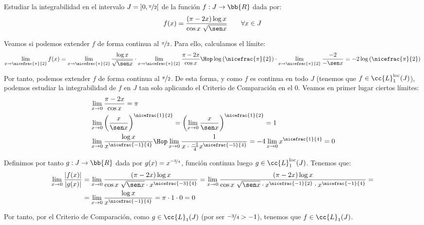 \begin{ejercicio}
    Estudiar la integrabilidad en el intervalo $J=\left]0,\nicefrac{\pi}{2}\right[$ de la función $f:J\to \bb{R}$ dada por:
    \begin{equation*}
        f(x) = \dfrac{(\pi-2x)\log x}{\cos x~\sqrt{\sen x}}
        \qquad \forall x\in J
    \end{equation*}

    Veamos si podemos extender $f$ de forma continua al $\nicefrac{\pi}{2}$. Para ello, calculamos el límite:
    \begin{equation*}
        \lim_{x\to \nicefrac{\pi}{2}} f(x)
        = \lim_{x\to \nicefrac{\pi}{2}} \dfrac{\log x}{\sqrt{\sen x}}\cdot \lim_{x\to \nicefrac{\pi}{2}} \dfrac{\pi-2x}{\cos x}
        \Hop \log\left(\nicefrac{\pi}{2}\right)\cdot \lim_{x\to \nicefrac{\pi}{2}} \dfrac{-2}{-\sen x}
        = -2\log\left(\nicefrac{\pi}{2}\right)
    \end{equation*}

    Por tanto, podemos extender $f$ de forma continua al $\nicefrac{\pi}{2}$. De esta forma, y como $f$ es continua en todo $J$ (tenemos que $f\in \cc{L}_1^{\text{loc}}(J)$), podemos estudiar la integrabilidad de $f$ en $J$ tan solo aplicando el Criterio de Comparación en el $0$.
    Veamos en primer lugar ciertos límites:
    \begin{align*}
        &\lim_{x\to 0} \dfrac{\pi-2x}{\cos x}=\pi\\
        &\lim_{x\to 0} \left(\frac{x}{\sen x}\right)^{\nicefrac{1}{2}}=\left(\lim_{x\to 0} \frac{x}{\sen x}\right)^{\nicefrac{1}{2}}=1\\
        &\lim_{x\to 0} \dfrac{\log x}{x^{\nicefrac{-1}{4}}}
        \Hop  \lim_{x\to 0} \dfrac{1}{x\cdot \frac{-1}{4}x^{\nicefrac{-5}{4}}}
        = -4 \lim_{x\to 0} x^{\nicefrac{1}{4}} = 0
    \end{align*}

    Definimos por tanto $g:J\to \bb{R}$ dada por $g(x)=x^{\nicefrac{-3}{4}}$, función continua luego $g\in \cc{L}_1^{\text{loc}}(J)$. Tenemos que:
    \begin{align*}
        \lim_{x\to 0} \dfrac{|f(x)|}{|g(x)|}
        &= \lim_{x\to 0} \dfrac{(\pi-2x)\log x}{\cos x~\sqrt{\sen x}\cdot x^{\nicefrac{-3}{4}}}
        = \lim_{x\to 0} \dfrac{(\pi-2x)\log x}{\cos x~\sqrt{\sen x}\cdot x^{\nicefrac{-1}{2}}\cdot x^{\nicefrac{-1}{4}}}
        =\\&= \lim_{x\to 0} \dfrac{\log x}{x^{\nicefrac{-1}{4}}}
        = \pi\cdot 1\cdot 0 = 0
    \end{align*}

    Por tanto, por el Criterio de Comparación, como $g\in \cc{L}_1(J)$ (por ser $\nicefrac{-3}{4}>-1$), tenemos que $f\in \cc{L}_1(J)$.
\end{ejercicio}


